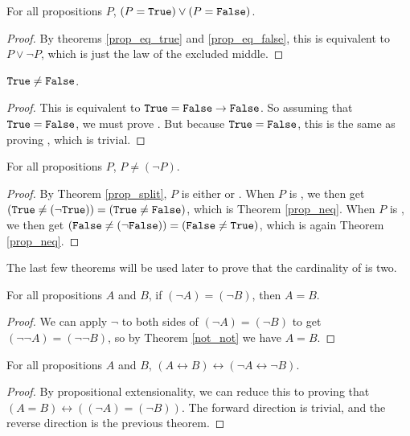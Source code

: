 \documentclass[../../math.tex]{subfiles}
\begin{document}
\begin{theorem} \label{prop_split}
    For all propositions $P$, $(P = \vtt{True}) \vee (P = \vtt{False})$.
\end{theorem}
\begin{proof}
    By theorems \ref{prop_eq_true} and \ref{prop_eq_false}, this is equivalent
    to $P \vee \neg P$, which is just the law of the excluded middle.
\end{proof}

\begin{theorem} \label{prop_neq}
    $\vtt{True} \neq \vtt{False}$.
\end{theorem}
\begin{proof}
    This is equivalent to $\vtt{True} = \vtt{False} \rightarrow \vtt{False}$.
    So assuming that $\vtt{True} = \vtt{False}$, we must prove .  But
    because $\vtt{True} = \vtt{False}$, this is the same as proving ,
    which is trivial.
\end{proof}

\begin{theorem}
    For all propositions $P$, $P \neq (\neg P)$.
\end{theorem}
\begin{proof}
    By Theorem \ref{prop_split}, $P$ is either  or .  When
    $P$ is , we then get $(\vtt{True} \neq (\neg \vtt{True})) =
    (\vtt{True} \neq \vtt{False})$, which is Theorem \ref{prop_neq}.  When $P$
    is , we then get $(\vtt{False} \neq (\neg \vtt{False})) =
    (\vtt{False} \neq \vtt{True})$, which is again Theorem \ref{prop_neq}.
\end{proof}
\noindent The last few theorems will be used later to prove that the cardinality
of  is two.

\begin{theorem} \label{not_eq_eq}
    For all propositions $A$ and $B$, if $(\neg A) = (\neg B)$, then $A = B$.
\end{theorem}
\begin{proof}
    We can apply $\neg$ to both sides of $(\neg A) = (\neg B)$ to get $(\neg
    \neg A) = (\neg \neg B)$, so by Theorem \ref{not_not} we have $A = B$.
\end{proof}

\begin{theorem} \label{not_eq_iff}
    For all propositions $A$ and $B$, $(A \leftrightarrow B) \leftrightarrow
    (\neg A \leftrightarrow \neg B)$.
\end{theorem}
\begin{proof}
    By propositional extensionality, we can reduce this to proving that $(A = B)
    \leftrightarrow ((\neg A) = (\neg B))$.  The forward direction is trivial,
    and the reverse direction is the previous theorem.
\end{proof}
\end{document}
